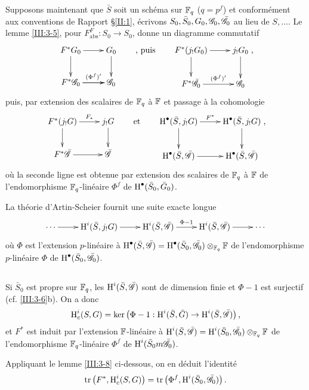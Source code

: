 Supposons maintenant que $\bar S$ soit un schéma sur $\mathbb{F}_q$ ($q=p^f$) et 
conformément aux conventions de Rapport \S\ref{II:1}, écrivons 
$S_0,\bar S_0,G_0,\mathscr{G}_0,\bar{\mathscr{G}}_0$ au lieu de $S,\dots$. Le lemme 
\ref{III:3-5}, pour $F_\text{abs}^F:S_0\to S_0$, donne un diagramme commutatif 
\[\xymatrix{
  F^* G_0 \ar[r] \ar[d] 
    & G_0 \ar[d] \\
  F^*\cG_0 \ar[r]^-{(\Phi^f)'} \ar[r] 
    & \cG_0 
}\qquad\text{, puis}\qquad 
\xymatrix{
  F^*(j_! G_0) \ar[r] \ar[d] 
    & j_!G_0 \ar[d] \\
  F^*\bar\cG_0 \ar[r]^-{(\Phi^f)'}
    & \cG_0
}\text{,}
\]
puis, par extension des scalaires de $\mathbb{F}_q$ à $\mathbb{F}$ et passage à la 
cohomologie 
\[\xymatrix{
  F^*(j_! G) \ar[r]^-{F_*} \ar[d] 
    & j_!G \ar[d] \\
  F^*\bar\cG \ar[r]
    & \bar\cG
}\qquad\text{et}\qquad 
\xymatrix{
  \h^\bullet(\bar S,j_! G) \ar[r]^-{F^*} \ar[d] 
    & \h^\bullet(\bar S,j_!G) \ar[d] \\
  \h^\bullet(\bar S,\bar\cG) \ar[r]
    & \h^\bullet(\bar S,\bar\cG)
}\text{,}
\]
où la seconde ligne est obtenue par extension des scalaires de $\mathbb{F}_q$ à 
$\mathbb{F}$ de l'endomorphisme $\mathbb{F}_q$-linéaire $\Phi^f$ de 
$\operatorname{H}^\bullet(\bar S_0,\bar G_0)$. 

La théorie d'Artin-Scheier fournit une suite exacte longue 
\[\xymatrix{
  \cdots \ar[r]
    & \h^i(\bar S,j_! G) \ar[r]
    & \h^i(\bar S,\bar\cG) \ar[r]^-{\Phi-1}
    & \h^i(\bar S,\bar\cG) \ar[r]
    & \cdots
}\]
où $\Phi$ est l'extension $p$-linéaire à 
$\operatorname{H}^\bullet(\bar S,\bar {\mathscr{G}})= \operatorname{H}^\bullet(\bar S_0,\bar{\mathscr{G}}_0)\otimes_{\mathbb{F}_q}\mathbb{F}$ 
de l'endomorphisme $p$-linéaire $\Phi$ de $\operatorname{H}^\bullet(\bar S_0,\bar{\mathscr{G}}_0)$. 





\subsection{}\label{III:3-7}

Si $\bar S_0$ est propre sur $\mathbb{F}_q$, les $\operatorname{H}^i(\bar S,\bar{\mathscr{G}})$ sont de 
dimension finie et $\Phi-1$ est surjectif (cf. \ref{III:3-6}b). On a donc 
\[
  \operatorname{H}_c^i(S,G) = \ker\left(\Phi-1 : \operatorname{H}^i(\bar S,\bar G) \to \operatorname{H}^i(\bar S,\bar{\mathscr{G}})\right) \text{,}
\]
et $F^*$ est induit par l'extension $\mathbb{F}$-linéaire à 
$\operatorname{H}^i(\bar S,\bar{\mathscr{G}}) = \operatorname{H}^i(\bar S_0,\bar{\mathscr{G}}_0)\otimes_{\mathbb{F}_q}\mathbb{F}$ de 
l'endomorphisme $\mathbb{F}_q$-linéaire $\Phi^f$ de $\operatorname{H}^i(\bar S_0m\bar{\mathscr{G}}_0)$. 

Appliquant le lemme \ref{III:3-8} ci-dessous, on en déduit l'identité 
\begin{equation}\label{III:eq:3-7-1}
  \operatorname{tr}\left(F^*,\operatorname{H}_c^i(S,G)\right) = \operatorname{tr}\left(\Phi^f,\operatorname{H}^i(\bar S_0,\bar{\mathscr{G}}_0)\right) \text{.}
\end{equation}





